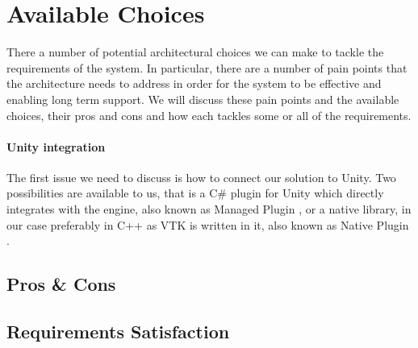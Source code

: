 \section{Available Choices}\label{sec:available-choices}

There a number of potential architectural choices we can make to tackle the requirements of the system. In particular, there are a number of pain points that the architecture needs to address in order for the system to be effective and enabling long term support. We will discuss these pain points and the available choices, their pros and cons and how each tackles some or all of the requirements.

\paragraph{Unity integration} The first issue we need to discuss is how to connect our solution to Unity. Two possibilities are available to us, that is a C\# plugin for Unity which directly integrates with the engine, also known as Managed Plugin \cite{UnityMan17}, or a native library, in our case preferably in C++ as VTK is written in it, also known as Native Plugin \cite{UnityMan17}. 

\subsection{Pros \& Cons}\label{sec:available-choices-pros-and-cons}



\subsection{Requirements Satisfaction}\label{sec:available-choices-requirements-satisfaction}